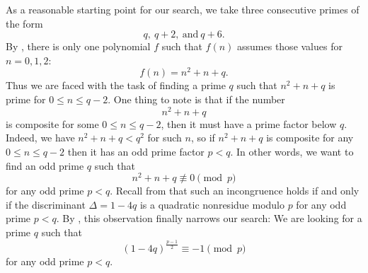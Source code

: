 As a reasonable starting point for our search, we take three consecutive primes of the form
\begin{equation*}
  q,~q+2,~\text{and}~q+6.
\end{equation*}
By , there is only one polynomial $f$ such that $f(n)$ assumes those values for $n=0,1,2$:
\begin{equation*}
  f(n)=n^2+n+q.
\end{equation*}
Thus we are faced with the task of finding a prime $q$ such that $n^2+n+q$ is prime for $0\leq n \leq q-2$. One thing to note is that if the number
\begin{equation*}
  n^2 + n+q
\end{equation*}
is composite for some $0\leq n\leq q-2$, then it must have a prime factor below $q$. Indeed, we have $n^2+n+q< q^2$ for such $n$, so if $n^2+n+q$ is composite for any $0\leq n\leq q-2$ then it has an odd prime factor $p<q$. In other words, we want to find an odd prime $q$ such that
\begin{equation*}
  n^2+n+q\nequiv 0\pmod{p}
\end{equation*}
for any odd prime $p<q$. Recall from  that such an incongruence holds if and only if the discriminant $\Delta=1-4q$ is a quadratic nonresidue modulo $p$ for any odd prime $p<q$. By , this observation finally narrows our search: We are looking for a prime $q$ such that
\begin{equation*}
  (1-4q)^{\frac{p-1}{2}} \equiv -1 \pmod{p}
\end{equation*}
for any odd prime $p<q$.

